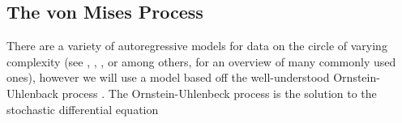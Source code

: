 \documentclass[12pt]{article}
\numberwithin{equation}{section}
\numberwithin{figure}{section}
\begin{document}
%
%
%
%
%
%

\subsection{The von Mises Process }

There are a variety of autoregressive models for data on the circle of varying complexity (see \cite{Coles}, \cite{fisher}, \cite{Harvey}, or \cite{Kato} among others, for an overview of many commonly used ones), however we will use a model based off the well-understood Ornstein-Uhlenback process \cite{oksendal}. The Ornstein-Uhlenbeck process is the solution to the stochastic differential equation
\end{document}
